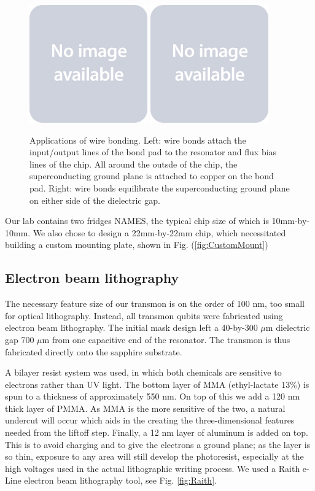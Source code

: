 \documentclass[11 pt, oneside]{book} %
\begin{document}
\begin{figure}[h] 
   \centering
   \includegraphics[width=2in]{placeholder.jpg} \includegraphics[width=2in]{placeholder.jpg} 
   \caption[Applications of wire bonding]{Applications of wire bonding. Left: wire bonds attach the input/output lines of the bond pad to the resonator and flux bias lines of the chip. All around the outsde of the chip, the superconducting ground plane is attached to copper on the bond pad. Right: wire bonds equilibrate the superconducting ground plane on either side of the dielectric gap.}
   \label{fig:Wirebonding}
\end{figure}

Our lab contains two fridges NAMES, the typical chip size of which is 10mm-by-10mm. We also chose to design a 22mm-by-22mm chip, which necessitated building a custom mounting plate, shown in Fig. (\ref{fig:CustomMount})

\subsection{Electron beam lithography}
The necessary feature size of our transmon is on the order of 100 nm, too small for optical lithography. Instead, all transmon qubits were fabricated using electron beam lithography. The initial mask design left a 40-by-300 $\mu$m dielectric gap 700 $\mu$m from one capacitive end of the resonator. The transmon is thus fabricated directly onto the sapphire substrate. 

A bilayer resist system was used, in which both chemicals are sensitive to electrons rather than UV light. The bottom layer of MMA (ethyl-lactate 13$\%$) is spun to a thickness of approximately 550 nm. On top of this we add a 120 nm thick layer of PMMA. As MMA is the more sensitive of the two, a natural undercut will occur which aids in the creating the three-dimensional features needed from the liftoff step. Finally, a 12 nm layer of aluminum is added on top. This is to avoid charging and to give the electrons a ground plane; as the layer is so thin, exposure to any area will still develop the photoresist, especially at the high voltages used in the actual lithographic writing process. We used a Raith e-Line electron beam lithography tool, see Fig. \ref{fig:Raith}. 
\end{document}
